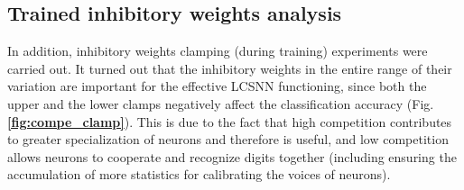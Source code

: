 \documentclass[a4paper,10pt]{article}
\newcommand{\refbf}[1]{\textbf{\ref{#1}}}
\begin{document}
\subsection{Trained inhibitory weights analysis}

In addition, inhibitory weights clamping (during training) experiments were carried out. It turned out that the inhibitory weights in the entire range of their variation are important for the effective LCSNN functioning, since both the upper and the lower clamps negatively affect the classification accuracy (Fig. \refbf{fig:compe_clamp}). This is due to the fact that high competition contributes to greater specialization of neurons and therefore is useful, and low competition allows neurons to cooperate and recognize digits together (including ensuring the accumulation of more statistics for calibrating the voices of neurons).
\end{document}
